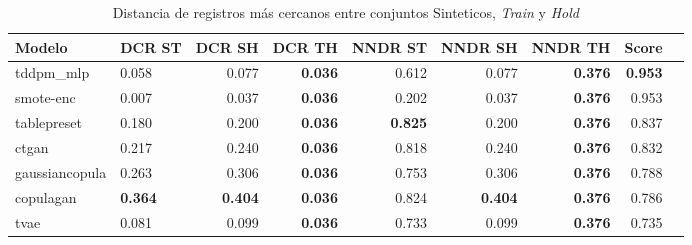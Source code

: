 \begin{table}[H]
\centering
\caption{Distancia de registros más cercanos entre conjuntos Sinteticos, \emph{Train} y \emph{Hold}}
\label{table-dcr-king county-a-1}
\begin{tabular}{|l|l|r|r|r|r|r|r|r|}
\hline
\rowcolor[gray]{0.8}
Modelo & DCR ST & DCR SH & DCR TH & NNDR ST & NNDR SH & NNDR TH & \textbf{Score} \\
\hline tddpm\_mlp & 0.058 & 0.077 & \bfseries 0.036 & 0.612 & 0.077 & \bfseries 0.376 & \bfseries 0.953 \\
\hline smote-enc & \cellcolor[rgb]{0.9, 0.54, 0.52} 0.007 & \cellcolor[rgb]{0.9, 0.54, 0.52} 0.037 & \bfseries 0.036 & 0.202 & 0.037 & \bfseries 0.376 & 0.953 \\
\hline tablepreset & 0.180 & 0.200 & \bfseries 0.036 & \bfseries 0.825 & 0.200 & \bfseries 0.376 & 0.837 \\
\hline ctgan & 0.217 & 0.240 & \bfseries 0.036 & 0.818 & 0.240 & \bfseries 0.376 & 0.832 \\
\hline gaussiancopula & 0.263 & 0.306 & \bfseries 0.036 & 0.753 & 0.306 & \bfseries 0.376 & 0.788 \\
\hline copulagan & \bfseries 0.364 & \bfseries 0.404 & \bfseries 0.036 & 0.824 & \bfseries 0.404 & \bfseries 0.376 & 0.786 \\
\hline tvae & 0.081 & 0.099 & \bfseries 0.036 & 0.733 & 0.099 & \bfseries 0.376 & 0.735 \\
\hline
\end{tabular}
\end{table}
